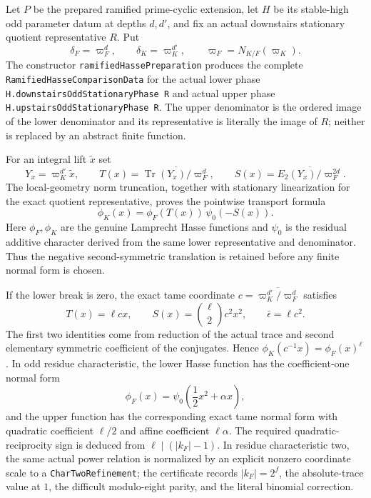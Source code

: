 \begin{theorem}
\label{mod:parameters-ramifiedhassepreparation}
Let $P$ be the prepared ramified prime-cyclic extension, let $H$ be its
stable-high odd parameter datum at depths $d,d'$, and fix an actual
downstairs stationary quotient representative $R$.  Put
\[
 \delta_F=\varpi_F^d,\qquad
 \delta_K=\varpi_K^{d'},\qquad
 \varpi_F=N_{K/F}(\varpi_K).
\]
The constructor \texttt{ramifiedHassePreparation} produces the complete
\texttt{RamifiedHasseComparisonData} for the actual lower phase
\texttt{H.downstairsOddStationaryPhase R} and actual upper phase
\texttt{H.upstairsOddStationaryPhase R}.  The upper denominator is the
ordered image of the lower denominator and its representative is literally
the image of $R$; neither is replaced by an abstract finite function.

For an integral lift $\tilde x$ set
\[
 Y_x=\varpi_K^{d'}\tilde x,\qquad
 T(x)=\overline{\operatorname{Tr}(Y_x)/\varpi_F^d},\qquad
 S(x)=\overline{E_2(Y_x)/\varpi_F^{2d}}.
\]
The local-geometry norm truncation, together with stationary
linearization for the exact quotient representative, proves the pointwise
transport formula
\[
 \phi_K(x)=\phi_F(T(x))\,\psi_0(-S(x)).
\]
Here $\phi_F,\phi_K$ are the genuine Lamprecht Hasse functions and
$\psi_0$ is the residual additive character derived from the same lower
representative and denominator.  Thus the negative second-symmetric
translation is retained before any finite normal form is chosen.

If the lower break is zero, the exact tame coordinate
$c=\overline{\varpi_K^{d'}/\varpi_F^d}$ satisfies
\[
 T(x)=\ell cx,\qquad
 S(x)=\binom{\ell}{2}c^2x^2,\qquad
 \bar\epsilon=\ell c^2.
\]
The first two identities come from reduction of the actual trace and
second elementary symmetric coefficient of the conjugates.  Hence
$\phi_K(c^{-1}x)=\phi_F(x)^\ell$.  In odd residue characteristic,
the lower Hasse function has the coefficient-one normal form
\[
 \phi_F(x)=\psi_0\left(\frac12x^2+\alpha x\right),
\]
and the upper function has the corresponding exact tame normal form with
quadratic coefficient $\ell/2$ and affine coefficient $\ell\alpha$.
The required quadratic-reciprocity sign is deduced from
$\ell\mid(|k_F|-1)$.  In residue characteristic two, the same actual
power relation is normalized by an explicit nonzero coordinate scale to a
\texttt{CharTwoRefinement}; the certificate records $|k_F|=2^f$, the
absolute-trace value at $1$, the difficult modulo-eight parity, and the
literal binomial correction.


\end{theorem}
